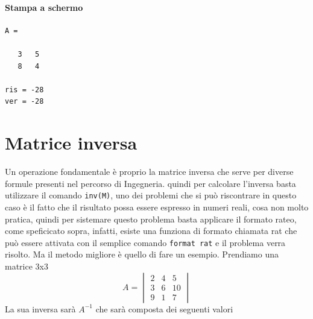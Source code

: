 \documentclass{book}
\begin{document}

\paragraph{Stampa a schermo}

\begin{verbatim}
A =

   3   5
   8   4

ris = -28
ver = -28
\end{verbatim}

\section{Matrice inversa}
\label{sec:mtxInv}
Un operazione fondamentale è proprio la matrice inversa che serve per diverse
formule presenti nel percorso di Ingegneria. quindi per calcolare l'inversa basta utilizzare il comando \lstinline|inv(M)|, uno dei problemi che si può
riscontrare in questo caso è il fatto che il risultato possa essere espresso in
numeri reali, cosa non molto pratica, quindi per sistemare questo problema
basta applicare il formato rateo, come speficicato sopra, infatti, esiste
una funziona di formato chiamata rat che può essere attivata con il semplice
comando \lstinline|format rat| e il problema verra risolto.
Ma il metodo migliore è quello di fare un esempio. Prendiamo una matrice 3x3
\begin{equation}
  \label{eq:es3}
  A=\begin{vmatrix}
    2  & 4 & 5\\
    3  & 6 & 10\\
    9  & 1 & 7
  \end{vmatrix}
\end{equation}
La sua inversa sarà $A^{-1}$ che sarà composta dei seguenti valori
\end{document}

